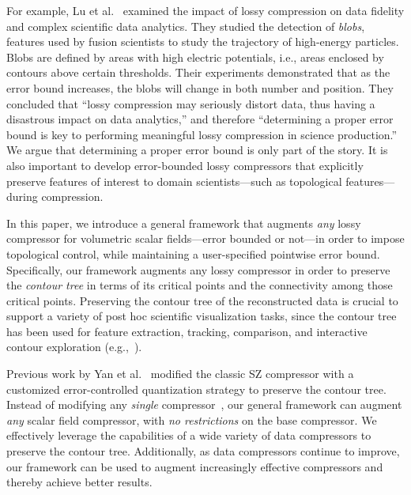 For example, Lu et al.~\cite{lu2018understanding} examined the impact of lossy compression on data fidelity and complex scientific data analytics.
They studied the detection of \emph{blobs}, features used by fusion scientists to study the trajectory of high-energy particles. 
Blobs are defined by areas with high electric potentials, i.e., areas enclosed by contours above certain thresholds. 
Their experiments demonstrated that as the error bound increases, the blobs will change in both number and position. 
They concluded that ``lossy compression may seriously distort
data, thus having a disastrous impact on data analytics,'' and therefore ``determining a proper error bound is key to performing
meaningful lossy compression in science production.''~\cite{lu2018understanding} 
We argue that determining a proper error bound is only part of the story. It is also important to develop error-bounded lossy compressors that explicitly preserve features of interest to domain scientists---such as topological features---during compression. 

In this paper, we introduce a general framework that augments \emph{any} lossy compressor for volumetric scalar fields---error bounded or not---in order to impose topological control, while maintaining a user-specified pointwise error bound.  
Specifically, our framework augments any lossy compressor in order to preserve the \emph{contour tree} in terms of its critical points and the connectivity among those critical points. 
Preserving the contour tree of the reconstructed data is crucial to support a variety of post hoc scientific visualization tasks, since the contour tree has been used for feature extraction, tracking, comparison, and interactive contour exploration (e.g.,~\cite{zhou2009automatic, kopp2022temporal}). 

Previous work by Yan et al.~\cite{yan2023toposz} modified the classic SZ compressor with a customized error-controlled quantization strategy to preserve the contour tree. 
Instead of modifying any \emph{single} compressor~\cite{yan2023toposz}, our general framework can augment \emph{any} scalar field compressor, with \emph{no restrictions} on the base compressor. We effectively leverage the capabilities of a wide variety of data compressors to preserve the contour tree. 
Additionally, as data compressors continue to improve, our framework can be used to augment increasingly effective compressors and thereby achieve better results. 
 
